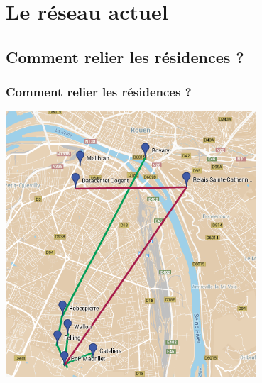 \documentclass[handout]{beamer}
\begin{document}
	\section{Le réseau actuel}

	\subsection{Comment relier les résidences ?}
		\begin{frame}
		\frametitle{Comment relier les résidences ?}
		\vspace{-5px}
		\begin{center}
			\includegraphics[width=0.70\textwidth]{images/futurReseau.png}
		\end{center}
		
		\end{frame}
\end{document}

